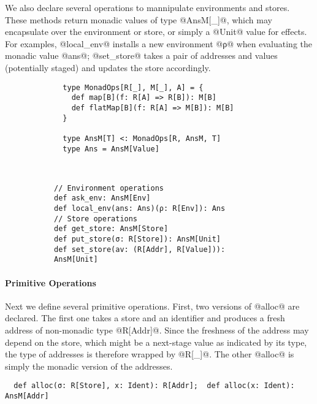 We also declare several operations to mannipulate environments and
stores. These methods return monadic values of type @AnsM[_]@, which
may encapsulate over the environment or store, or simply a @Unit@
value for effects. For examples, @local_env@ installs a new environment
@ρ@ when evaluating the monadic value @ans@; @set_store@ takes a pair of
addresses and values (potentially staged) and updates the store accordingly.

\begin{figure}[h!]
  \centering
  \begin{subfigure}[b]{0.45\textwidth}
    \begin{lstlisting}
  type MonadOps[R[_], M[_], A] = {
    def map[B](f: R[A] => R[B]): M[B]
    def flatMap[B](f: R[A] => M[B]): M[B]
  }
  
  type AnsM[T] <: MonadOps[R, AnsM, T]
  type Ans = AnsM[Value]
    \end{lstlisting}
  \end{subfigure}
  ~
  \begin{subfigure}[b]{0.55\textwidth}
    \begin{lstlisting}
// Environment operations
def ask_env: AnsM[Env]
def local_env(ans: Ans)(ρ: R[Env]): Ans
// Store operations
def get_store: AnsM[Store]
def put_store(σ: R[Store]): AnsM[Unit]
def set_store(av: (R[Addr], R[Value])): AnsM[Unit]
    \end{lstlisting}
  \end{subfigure}
\end{figure}

\paragraph{Primitive Operations} Next we define several primitive operations.
First, two versions of @alloc@ are declared. The first one takes a store and an
identifier and produces a fresh address of non-monadic type @R[Addr]@. Since
the freshness of the address may depend on the store, which might be a
next-stage value as indicated by its type, the type of addresses is therefore
wrapped by @R[_]@. The other @alloc@ is simply the monadic version of the addresses.
\begin{lstlisting}
  def alloc(σ: R[Store], x: Ident): R[Addr];  def alloc(x: Ident): AnsM[Addr]
\end{lstlisting}

